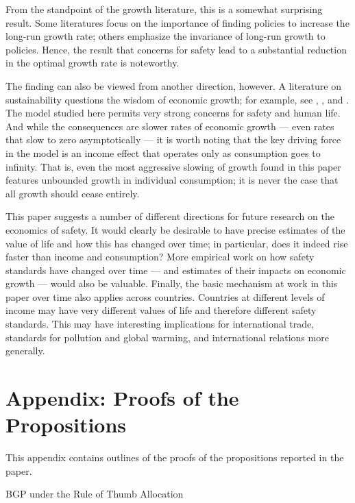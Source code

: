 \documentclass[12pt,twoside]{article}
\newcommand{\cn}[1]{\citet*{#1}}
\newcommand{\Proof}[2]{\newline {\hspace{-\parindent} {\color{ChadGreen}\bf Proof of Proposition}~\ref{#1}.}
{\color{ChadBlue} #2} \vspace{.1in}}
\begin{document}
From the standpoint of the growth literature, this is a somewhat
surprising result. Some literatures focus on the importance of finding
policies to increase the long-run growth rate; others emphasize the
invariance of long-run growth to policies.  Hence, the result that
concerns for safety lead to a substantial reduction in the optimal
growth rate is noteworthy.  

The finding can also be viewed from another direction, however. A
literature on sustainability questions the wisdom of economic growth;
for example, see \cn{Ehrlich68}, \cn{Meadowsetal72}, and \cn{Mishan93}.
The model studied here permits very strong concerns for safety and human
life. And while the consequences are slower rates of economic growth ---
even rates that slow to zero asymptotically --- it is worth noting that
the key driving force in the model is an income effect that operates
only as consumption goes to infinity. That is, even the most aggressive
slowing of growth found in this paper features unbounded growth in
individual consumption; it is never the case that all growth should
cease entirely.

This paper suggests a number of different directions for future research
on the economics of safety. It would clearly be desirable to have
precise estimates of the value of life and how this has changed over
time; in particular, does it indeed rise faster than income and
consumption? More empirical work on how safety standards have changed
over time --- and estimates of their impacts on economic growth ---
would also be valuable. Finally, the basic mechanism at work in this
paper over time also applies across countries. Countries at different
levels of income may have very different values of life and therefore
different safety standards. This may have interesting implications for
international trade, standards for pollution and global warming, and
international relations more generally.




\appendix
\section{Appendix: Proofs of the Propositions}
\label{app:proofs}

This appendix contains outlines of the proofs of the propositions
reported in the paper.

\hypertarget{proof:rule}{} 
\Proof{prop:rule}{BGP under the Rule of Thumb Allocation} 
\end{document}
